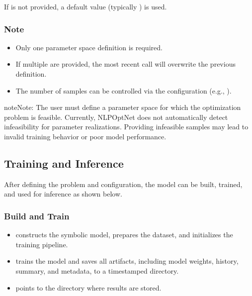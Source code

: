\documentclass[letterpaper,10pt,english,openany,oneside]{sphinxmanual}
\begin{document}
\sphinxAtStartPar
If  is not provided, a default value (typically ) is used.


\subsubsection{Note}
\label{\detokenize{user-guide/defining-parameter-space:note}}\begin{itemize}
\item {} 
\sphinxAtStartPar
Only one parameter space definition is required.

\item {} 
\sphinxAtStartPar
If multiple are provided, the most recent call will overwrite the previous definition.

\item {} 
\sphinxAtStartPar
The number of samples can be controlled via the configuration (e.g., ).

\end{itemize}

\begin{sphinxadmonition}{note}{Note:}
\sphinxAtStartPar
The user must define a parameter space for which the optimization problem is feasible.
Currently, NLPOpt\sphinxhyphen{}Net does not automatically detect infeasibility for parameter realizations.
Providing infeasible samples may lead to invalid training behavior or poor model performance.
\end{sphinxadmonition}

\sphinxstepscope


\subsection{Training and Inference}
\label{\detokenize{user-guide/training-and-inference:training-and-inference}}\label{\detokenize{user-guide/training-and-inference::doc}}
\sphinxAtStartPar
After defining the problem and configuration, the model can be built, trained, and used for inference as shown below.


\subsubsection{Build and Train}
\label{\detokenize{user-guide/training-and-inference:build-and-train}}\begin{itemize}
\item {} 
\sphinxAtStartPar
{} constructs the symbolic model, prepares the dataset, and initializes the training pipeline.

\item {} 
\sphinxAtStartPar
{} trains the model and saves all artifacts, including model weights, history, summary, and metadata, to a timestamped directory.

\item {} 
\sphinxAtStartPar
{} points to the directory where results are stored.

\end{itemize}
\end{document}
